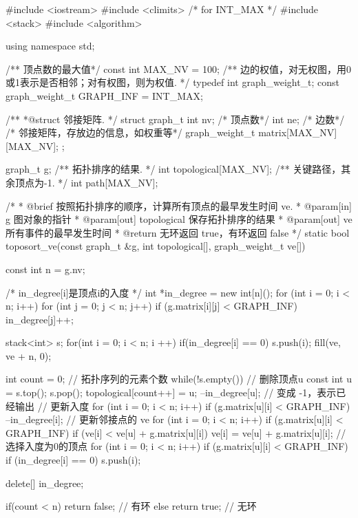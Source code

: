 \begin{Codex}[label=am_graph_critical_path.cpp]
#include <iostream>
#include <climits>  /* for INT_MAX */
#include <stack>
#include <algorithm>

using namespace std;

/** 顶点数的最大值*/
const int MAX_NV = 100;
/** 边的权值，对无权图，用0或1表示是否相邻；对有权图，则为权值. */
typedef int graph_weight_t;
const graph_weight_t GRAPH_INF = INT_MAX;

/**
 *@struct 邻接矩阵.
 */
struct graph_t {
    int nv; /* 顶点数*/
    int ne; /* 边数*/
    /* 邻接矩阵，存放边的信息，如权重等*/
    graph_weight_t matrix[MAX_NV][MAX_NV];
};

graph_t g;
/** 拓扑排序的结果. */
int topological[MAX_NV];
/** 关键路径，其余顶点为-1. */
int path[MAX_NV];

/*
  * @brief 按照拓扑排序的顺序，计算所有顶点的最早发生时间 ve.
  * @param[in] g 图对象的指针
  * @param[out] topological 保存拓扑排序的结果
  * @param[out] ve 所有事件的最早发生时间
  * @return 无环返回 true，有环返回 false
  */
static bool toposort_ve(const graph_t &g, int topological[],
        graph_weight_t ve[]) {
    const int n = g.nv;

    /* in_degree[i]是顶点i的入度 */
    int *in_degree = new int[n]();
    for (int i = 0; i < n; i++) {
        for (int j = 0; j < n; j++) {
            if (g.matrix[i][j] < GRAPH_INF)
                in_degree[j]++;
        }
    }

    stack<int> s;
    for(int i = 0; i < n; i ++) {
        if(in_degree[i] == 0) {
            s.push(i);
        }
    }
    fill(ve, ve + n, 0);

    int count = 0; // 拓扑序列的元素个数
    while(!s.empty()) {
        // 删除顶点u
        const int u = s.top(); s.pop();
        topological[count++] = u;
        --in_degree[u];  // 变成 -1，表示已经输出
        // 更新入度
        for (int i = 0; i < n; i++) if (g.matrix[u][i] < GRAPH_INF) {
            --in_degree[i];
        }
        // 更新邻接点的 ve
        for (int i = 0; i < n; i++) if (g.matrix[u][i] < GRAPH_INF) {
            if (ve[i] < ve[u] + g.matrix[u][i])
                ve[i] = ve[u] + g.matrix[u][i];
        }
        // 选择入度为0的顶点
        for (int i = 0; i < n; i++) if (g.matrix[u][i] < GRAPH_INF) {
            if (in_degree[i] == 0) s.push(i);
        }
    }

    delete[] in_degree;

    if(count < n) return false; // 有环
    else          return true;  // 无环
}


\end{Codex}

